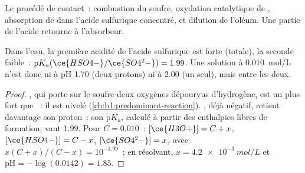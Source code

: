 \begin{omfigure}

{\small Le procédé de contact~: combustion du soufre, oxydation
catalytique de , absorption de  dans l'acide sulfurique
concentré, et dilution de l'oléum. Une partie de l'acide retourne à
l'absorbeur.}
\end{omfigure}

\begin{proposition}\label{prop:b1:p-block-16-18:sulfuric-strength}
Dans l'eau, la première acidité de l'acide sulfurique est forte
(totale), la seconde faible~: $\mathrm{p}K_a(\ce{HSO4-}/\ce{SO4^2-}) = 1.99$.
Une solution à
\qty{0.010}{mol/L} n'est donc ni à pH 1.70 (deux protons) ni à 2.00 (un
seul), mais entre les deux.
\end{proposition}

\begin{proof}
, qui porte sur le soufre deux oxygènes dépourvus
d'hydrogène, est un  plus fort que ~: il est nivelé
(\cref{ch:b1:predominant-reaction}).
, déjà négatif, retient davantage son proton~: son
$\mathrm{p}K_a$,
calculé à partir des enthalpies libres de formation, vaut 1.99. Pour
$C = 0.010$~:
$[\ce{H3O+}] = C + x$, $[\ce{HSO4-}] = C - x$, $[\ce{SO4^2-}] = x$, avec
$x(C + x)/(C - x) = 10^{-1.99}$~; en résolvant, $x = \qty{4.2e-3}{mol/L}$
et
$\mathrm{pH} = -\log(0.0142) = 1.85$.
\end{proof}

